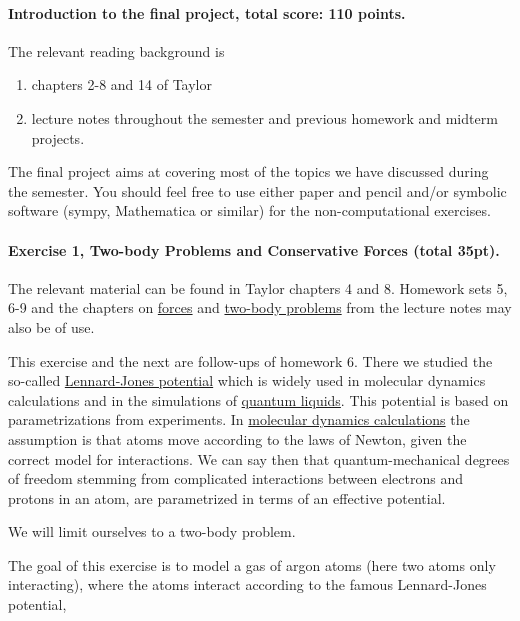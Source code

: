 \documentclass[%
oneside,                 %
final,                   %
10pt]{article}
\begin{document}
\noindent
\paragraph{Introduction to the final project, total score: 110  points.}
The relevant reading background is
\begin{enumerate}
\item chapters 2-8 and 14 of Taylor

\item lecture notes throughout the semester and previous homework and midterm projects.
\end{enumerate}

\noindent
The final project aims at covering most of the topics we have
discussed during the semester. You should feel free to use either
paper and pencil and/or symbolic software (sympy, Mathematica or
similar) for the non-computational exercises.

\paragraph{Exercise 1, Two-body Problems and Conservative Forces (total 35pt).}
The relevant material can be found in Taylor chapters 4 and 8. Homework sets 5, 6-9 and the chapters on \href{{https://mhjensen.github.io/Physics321/doc/LectureNotes/_build/html/chapter4.html}}{forces} and \href{{https://mhjensen.github.io/Physics321/doc/LectureNotes/_build/html/chapter6.html}}{two-body problems} from the lecture notes may also be of use. 

This exercise and the next are  follow-ups of homework 6. There we studied the so-called
\href{{https://en.wikipedia.org/wiki/Lennard-Jones_potential}}{Lennard-Jones potential} which is widely used in molecular dynamics
calculations and in the simulations of \href{{https://journals.aps.org/prb/abstract/10.1103/PhysRevB.40.11070}}{quantum liquids}. This potential is based on parametrizations from
experiments. In \href{{https://en.wikipedia.org/wiki/Molecular_dynamics}}{molecular dynamics calculations} the assumption is
that atoms move according to the laws of Newton, given the correct
model for interactions. We can say then that quantum-mechanical
degrees of freedom stemming from complicated interactions between electrons
and protons in an atom, are parametrized in terms of an effective
potential.

We will limit ourselves to a two-body problem.

The goal of this exercise is to model a gas of argon atoms (here two
atoms only interacting), where the atoms interact according to the
famous Lennard-Jones potential,
\end{document}
